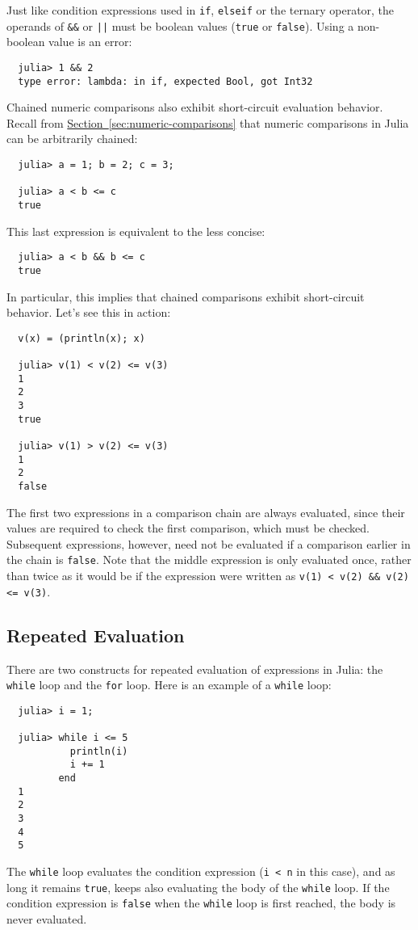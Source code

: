 \documentclass{article}
\renewcommand{\sec}[1]{\label{sec:#1}}
\newcommand{\Section}[1]{\hyperref[sec:#1]{Section~\ref*{sec:#1}}}
\begin{document}
Just like condition expressions used in \verb|if|, \verb|elseif| or the ternary operator, the operands of \verb|&&| or \texttt{||} must be boolean values (\verb|true| or \verb|false|).
Using a non-boolean value is an error:
\begin{verbatim}
  julia> 1 && 2
  type error: lambda: in if, expected Bool, got Int32
\end{verbatim}

Chained numeric comparisons also exhibit short-circuit evaluation behavior.
Recall from \Section{numeric-comparisons} that numeric comparisons in Julia can be arbitrarily chained:
\begin{verbatim}
  julia> a = 1; b = 2; c = 3;

  julia> a < b <= c
  true
\end{verbatim}
This last expression is equivalent to the less concise:
\begin{verbatim}
  julia> a < b && b <= c
  true
\end{verbatim}
In particular, this implies that chained comparisons exhibit short-circuit behavior.
Let's see this in action:
\begin{verbatim}
  v(x) = (println(x); x)

  julia> v(1) < v(2) <= v(3)
  1
  2
  3
  true

  julia> v(1) > v(2) <= v(3)
  1
  2
  false
\end{verbatim} %
The first two expressions in a comparison chain are always evaluated, since their values are required to check the first comparison, which must be checked.
Subsequent expressions, however, need not be evaluated if a comparison earlier in the chain is \verb|false|.
Note that the middle expression is only evaluated once, rather than twice as it would be if the expression were written as \verb|v(1) < v(2) && v(2) <= v(3)|.

\subsection{Repeated Evaluation}\sec{repeated-evaluation}

There are two constructs for repeated evaluation of expressions in Julia: the \verb|while| loop and the \verb|for| loop.
Here is an example of a \verb|while| loop:
\begin{verbatim}
  julia> i = 1;

  julia> while i <= 5
           println(i)
           i += 1
         end
  1
  2
  3
  4
  5
\end{verbatim}
The \verb|while| loop evaluates the condition expression (\verb|i < n| in this case), and as long it remains \verb|true|, keeps also evaluating the body of the \verb|while| loop.
If the condition expression is \verb|false| when the \verb|while| loop is first reached, the body is never evaluated.
\end{document}
